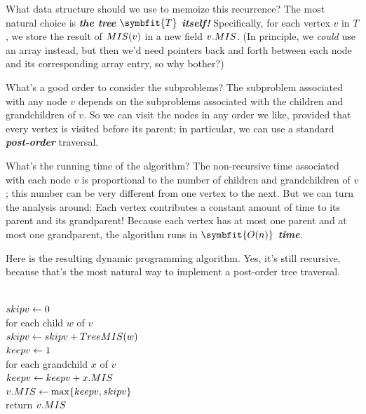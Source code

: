 What data structure should we use to memoize this recurrence?
The most natural choice is \textbf{\textit{the tree}} $\symbfit{T}$ \textbf{\textit{itself!}}
Specifically, for each vertex $v$ in $T$, we store the result of $MIS(v)$ in a new field $v.MIS$.
(In principle, we \textit{could} use an array instead, but then we’d need pointers back and forth between each node and its corresponding array entry, so why bother?)

What’s a good order to consider the subproblems?
The subproblem associated with any node $v$ depends on the subproblems associated with the children and grandchildren of $v$.
So we can visit the nodes in any order we like, provided that every vertex is visited before its parent; in particular, we can use a standard \textbf{\textit{post-order}} traversal.

What’s the running time of the algorithm?
The non-recursive time associated with each node $v$ is proportional to the number of children and grandchildren of $v$; this number can be very different from one vertex to the next.
But we can turn the analysis around: Each vertex contributes a constant amount of time to its parent and its grandparent!
Because each vertex has at most one parent and at most one grandparent, the algorithm runs in \textbf{\textit{$\symbfit{O(n)}$ time}}.

Here is the resulting dynamic programming algorithm.
Yes, it’s still recursive, because that’s the most natural way to implement a post-order tree traversal.

\begin{pseudocode}
\\
$skipv \gets 0$\\
for each child $w$ of $v$\\
\Indent $skipv \gets skipv + TreeMIS(w)$\\
$keepv \gets 1$\\
for each grandchild $x$ of $v$\\
\Indent $keepv \gets keepv + x.MIS$\\
$v.MIS \gets \max\{keepv, skipv\}$\\
return $v.MIS$
\end{pseudocode}

